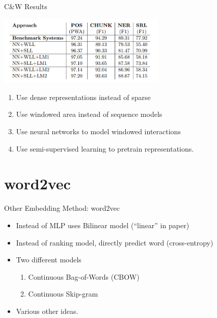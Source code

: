 \documentclass{beamer}
\begin{document}
\begin{frame}{C\&W Results}
  \begin{center}
    \includegraphics[width=8cm]{cwresults}
  \end{center}
  \begin{enumerate}
  \item Use dense representations instead of sparse
  \item Use windowed area instead of sequence models
  \item Use neural networks to model windowed interactions
  \item Use semi-supervised learning to pretrain representations.
  \end{enumerate}
\end{frame}

\section{word2vec}

\begin{frame}{Other Embedding Method: word2vec}
  \begin{itemize}
  \item Instead of MLP uses Bilinear model (``linear'' in paper)
    \air

  \item Instead of ranking model, directly predict word (cross-entropy)
    \air

  \item Two different models
    \begin{enumerate}
    \item Continuous Bag-of-Words (CBOW)
    \item Continuous Skip-gram
    \end{enumerate}

  \item Various other ideas.

  \end{itemize}
\end{frame}
\end{document}

